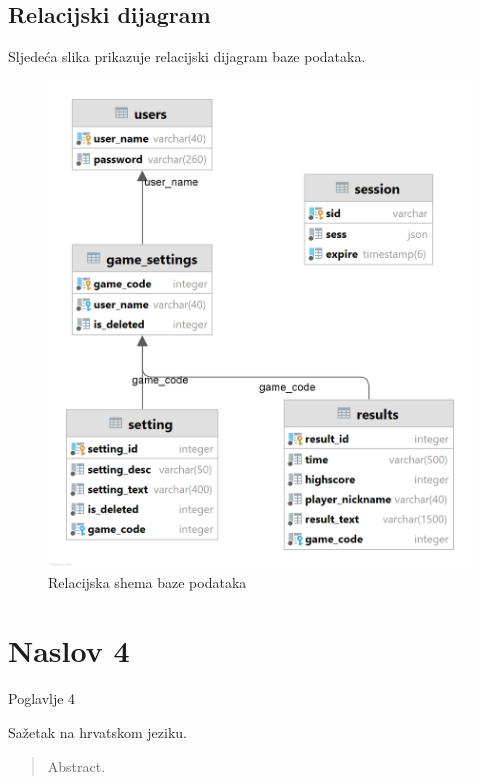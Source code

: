 \documentclass[times, utf8, zavrsni]{fer}
\begin{document}
	\newpage
	\section{Relacijski dijagram}
		Sljedeća slika prikazuje relacijski dijagram baze podataka.
		\begin{figure}[H]
			\includegraphics[width=\linewidth]{"slike/REL.png"} 
			\centering
			\caption{Relacijska shema baze podataka}
			\label{fig:relshema}
		\end{figure}


\chapter{Naslov 4}
Poglavlje 4




\begin{sazetak}
Sažetak na hrvatskom jeziku.

\end{sazetak}

\begin{abstract}
Abstract.

\end{abstract}
\end{document}

